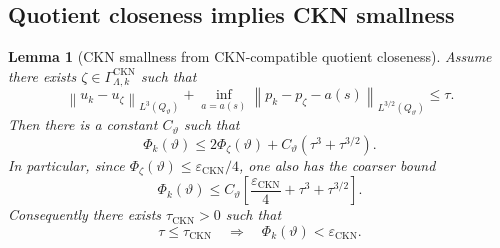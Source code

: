 \documentclass[11pt]{article}
\numberwithin{equation}{section}
\theoremstyle{plain}
\newtheorem{lemma}[theorem]{Lemma}
\theoremstyle{definition}
\theoremstyle{remark}
\newcommand{\norm}[1]{\left\lVert #1\right\rVert}
\begin{document}
\subsection{Quotient closeness implies CKN smallness}

\begin{lemma}[CKN smallness from CKN-compatible quotient closeness]
\label{lem:ckn-closeness-smallness}
Assume there exists \(\zeta\in\Gamma_{\Lambda,k}^{\mathrm{CKN}}\) such that
\[
  \norm{u_k-u_\zeta}_{L^3(Q_\vartheta)}
  +
  \inf_{a=a(s)}
  \norm{p_k-p_\zeta-a(s)}_{L^{3/2}(Q_\vartheta)}
  \le
  \tau.
\]
Then there is a constant \(C_\vartheta\) such that
\[
  \Phi_k(\vartheta)
  \le
  2\Phi_\zeta(\vartheta)
  +
  C_\vartheta(\tau^3+\tau^{3/2}).
\]
In particular, since
\(\Phi_\zeta(\vartheta)\le\varepsilon_{\mathrm{CKN}}/4\), one also has the
coarser bound
\[
  \Phi_k(\vartheta)
  \le
  C_\vartheta
  \left[
  \frac{\varepsilon_{\mathrm{CKN}}}{4}
  +
  \tau^3+\tau^{3/2}
  \right].
\]
Consequently there exists \(\tau_{\mathrm{CKN}}>0\) such that
\[
  \tau\le\tau_{\mathrm{CKN}}
  \quad\Longrightarrow\quad
  \Phi_k(\vartheta)<\varepsilon_{\mathrm{CKN}}.
\]
\end{lemma}
\end{document}
